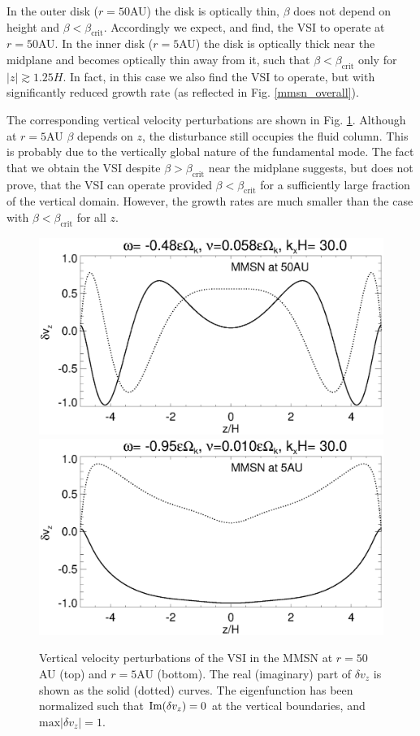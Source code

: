 In the outer disk ($r=50$AU) the disk is optically thin, $\beta$ 
does not depend on height and $\beta <
\beta_\mathrm{crit}$. Accordingly we expect, and find, the VSI to
operate at $r=50$AU. In the inner disk ($r=5$AU) the disk is optically
thick near the midplane and becomes optically thin away from it, such
that $\beta < \beta_\mathrm{crit}$ only for $|z|\gtrsim1.25H$. In
fact, in this case  we also find the VSI to operate, but with
significantly reduced growth rate (as reflected in
Fig. \ref{mmsn_overall}).  

The corresponding vertical velocity perturbations are shown in 
Fig. \ref{mmsn_eigenvz}. Although at $r=5$AU $\beta$ depends on $z$,
the disturbance still occupies the fluid column. This is probably due
to the vertically global nature of the fundamental mode. The fact that
we obtain the VSI despite $\beta > \beta_\mathrm{crit}$ near the
midplane suggests, but does not prove, that the VSI can operate
provided $\beta < \beta_\mathrm{crit}$ for a sufficiently large
fraction of the vertical domain. However, the growth rates are much
smaller than the case with $\beta < \beta_\mathrm{crit}$ for all $z$. 

\begin{figure}
  \includegraphics[width=\linewidth,clip=true,trim=0cm 1.75cm 0cm
  0cm]{figures/eigenvectorvz_mmsn_50AU}
  \includegraphics[width=\linewidth,clip=true,trim=0cm 0.0cm 0cm
  0cm]{figures/eigenvectorvz_mmsn_5AU}
  \caption{Vertical velocity perturbations of the VSI in the MMSN at 
    $r=50$AU (top) and $r=5$AU (bottom). The real (imaginary) part of 
    $\delta v_z$ is shown as
    the solid (dotted) curves. The eigenfunction has been normalized
    such that $\operatorname{Im}(\delta v_z)=0$ at the vertical boundaries, and
    $\mathrm{max}|\delta v_z|=1$. \label{mmsn_eigenvz}}
\end{figure}
